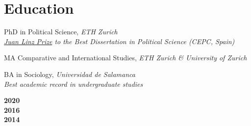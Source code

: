 \documentclass[a4paper, 12pt]{article}
\renewcommand\labelitemi{\textbf{--}}
\begin{document}
\vspace{-0pt}
\section*{Education}

\begin{minipage}[t]{0.89\textwidth}
  PhD in Political Science, \textit{ETH Zurich}\\
  {\color{white}{--}} \textit{\small \href{https://www.cepc.gob.es/premio-juan-linz}{Juan Linz Prize} to the Best Dissertation in Political Science (CEPC, Spain)}
  \vspace{3pt}

  MA Comparative and International Studies, \textit{ETH Zurich \& University of Zurich}
	\vspace{3pt}

	BA in Sociology, \textit{Universidad de Salamanca}\\
	{\color{white}{--}} \textit{\small Best academic record in undergraduate studies}
\end{minipage}
\begin{minipage}[t]{0.10\textwidth}
  \flushright
	\textbf{2020}\\\vspace{24pt}
  \textbf{2016}\\\vspace{8pt}
	\textbf{2014}
\end{minipage}



\end{document}
